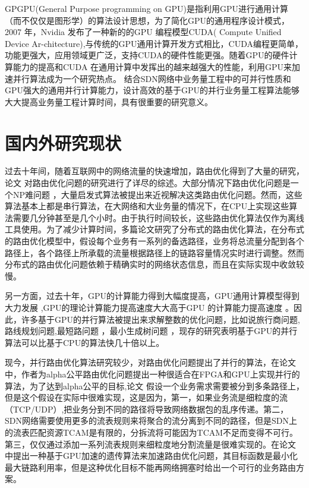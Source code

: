 \documentclass[master]{thesis-uestc}
\begin{document}
GPGPU(General Purpose programming on GPU)是指利用GPU进行通用计算（而不仅仅是图形学）的算法设计思想，为了简化GPU的通用程序设计模式，2007 年，Nvidia 发布了一种新的的GPU 编程模型CUDA( Compute Unified Device Ar-chitecture)\cite{CUDA},与传统的GPU通用计算开发方式相比，CUDA编程更简单，功能更强大，应用领域更广泛，支持CUDA的硬件性能更强。随着GPU的硬件计算能力的提高和CUDA 在通用计算中发挥出的越来越强大的性能，利用GPU来加速并行算法成为一个研究热点\cite{CUDAR}。
结合SDN网络中业务量工程中的可并行性质和GPU强大的通用并行计算能力，设计高效的基于GPU的并行业务量工程算法能够大大提高业务量工程计算时间，具有很重要的研究意义。
\section{国内外研究现状}
过去十年间，随着互联网中的网络流量的快速增加，路由优化得到了大量的研究，论文 \cite{TESurvey, TEDef, TESurvey1}对路由优化问题的研究进行了详尽的综述。大部分情况下路由优化问题是一个NP难问题 \cite{NP, multi-commodity}，大量启发式算法\cite{TESurvey, TEDef, TESurvey1}被提出来近视解决这类路由优化问题。然而，这些算法基本上都是串行算法，在大网络和大业务量的情况下，在CPU上实现这些算法需要几分钟甚至是几个小时\cite{SDNTE, ParaTE1, multi-commodity}。由于执行时间较长，这些路由优化算法仅作为离线工具使用\cite{Time}。为了减少计算时间，多篇论文\cite{mate, DATE}研究了分布式的路由优化算法，在分布式的路由优化模型中，假设每个业务有一系列的备选路径，业务将总流量分配到各个路径上，各个路径上所承载的流量根据路径上的链路容量情况实时进行调整。然而分布式的路由优化问题依赖于精确实时的网络状态信息，而且在实际实现中收敛较慢。

另一方面，过去十年，GPU的计算能力得到大幅度提高，GPU通用计算模型得到大力发展 \cite{GPUdeve, CUDA},GPU的理论计算能力提高速度大大高于GPU 的计算能力提高速度 \cite{GPUdeve}。因此，许多基于GPU的并行算法被提出来求解整数的优化问题，比如说旅行商问题\cite{TSP},路线规划问题\cite{VRP},最短路问题 \cite{SSP1, SSP2}，最小生成树问题 \cite{MST}，现存的研究\cite{TSP, VRP, SSP1, SSP2, MST}表明基于GPU的并行算法可以比基于CPU的算法快几十倍以上。

 现今，并行路由优化算法研究较少，\cite{ParaTE1, ParaTE2}对路由优化问题提出了并行的算法，在论文\cite{ParaTE1}中，作者为alpha公平路由优化问题提出一种很适合在FPGA和GPU上实现并行的算法，为了达到alpha公平的目标,论文 \cite {ParaTE1}假设一个业务需求需要被分到多条路径上，但是这个假设在实际中很难实现，这是因为，第一，如果业务流是细粒度的流（TCP/UDP）,把业务分到不同的路径将导致网络数据包的乱序传递。第二，SDN网络需要使用更多的流表规则来将聚合的流分离到不同的路径，但是SDN上的流表匹配资源TCAM是有限的，分拆流将可能因为TCAM不足而变得不可行。第三，仅仅通过添加一系列流表规则来细粒度地分割流量是很难实现的。在论文 \cite{ParaTE2}中提出一种基于GPU加速的遗传算法来加速路由优化问题，其目标函数是最小化最大链路利用率，但是这种优化目标不能再网络拥塞时给出一个可行的业务路由方案。
\end{document}
